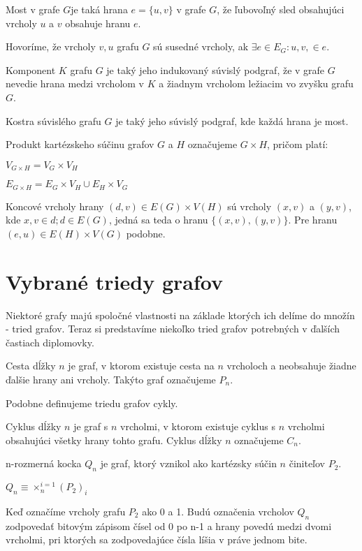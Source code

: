 \begin{defin}
Most v grafe $G$je taká hrana $e = \{ u,v \}$ v grafe $G$, že ľubovoľný sled 
obsahujúci vrcholy $u$ a $v$ obsahuje hranu $e$.
\end{defin}

\begin{defin}
Hovoríme, že vrcholy $v, u$ grafu $G$ sú susedné vrcholy, ak $\exists e \in
E_{G}: u,v, \in e$.
\end{defin}

\begin{defin}
Komponent $K$ grafu $G$ je taký jeho indukovaný súvislý podgraf, že v grafe 
$G$ nevedie hrana medzi vrcholom v $K$ a žiadnym vrcholom ležiacim vo 
zvyšku grafu $G$.
\end{defin}

\begin{defin}
Kostra súvislého grafu $G$ je taký jeho súvislý podgraf, kde každá hrana je
most.
\end{defin}

\begin{defin}
Produkt kartézskeho súčinu grafov $G$ a $H$ označujeme $G \times H$, pričom
platí:

$V_{G \times H} = V_{G} \times V_{H}$

$E_{G \times H} = E_{G} \times V_{H} \cup E_{H} \times V_{G} $

Koncové vrcholy hrany $(d,v) \in E(G) \times V(H)$ sú vrcholy $(x,v)$ a
$(y,v)$, kde $x,v \in d; d \in E(G)$, jedná sa teda o hranu $\{(x,v), (y,v)\}$.
Pre hranu $(e,u) \in E(H) \times V(G)$
podobne.
\end{defin}


\section{Vybrané triedy grafov}
Niektoré grafy majú spoločné vlastnosti na základe ktorých ich delíme do
množín - tried grafov.
Teraz si predstavíme niekoľko tried grafov potrebných v ďalších častiach
diplomovky. 

\begin{defin}
Cesta dĺžky $n$ je graf, v ktorom existuje cesta na $n$ vrcholoch a neobsahuje
žiadne ďalšie hrany ani vrcholy. Takýto graf označujeme $P_{n}$.
\end{defin}

Podobne definujeme triedu grafov cykly.

\begin{defin}
Cyklus dĺžky $n$ je graf s $n$ vrcholmi, v ktorom existuje cyklus s $n$
vrcholmi obsahujúci všetky hrany tohto grafu. Cyklus dĺžky $n$ označujeme
$C_{n}$.
\end{defin}

\begin{defin}
n-rozmerná kocka $Q_{n}$ je graf, ktorý vznikol ako kartézsky súčin $n$
činiteľov $P_{2}$.

$Q_{n} \equiv \times_{n}^{i=1} (P_{2})_{i}$

Keď označíme vrcholy grafu $P_{2}$ ako 0 a 1. Budú označenia vrcholov $Q_{n}$
zodpovedať bitovým zápisom čísel od 0 po n-1 a hrany povedú medzi dvomi
vrcholmi, pri ktorých sa zodpovedajúce čísla líšia v práve jednom bite.
\end{defin}